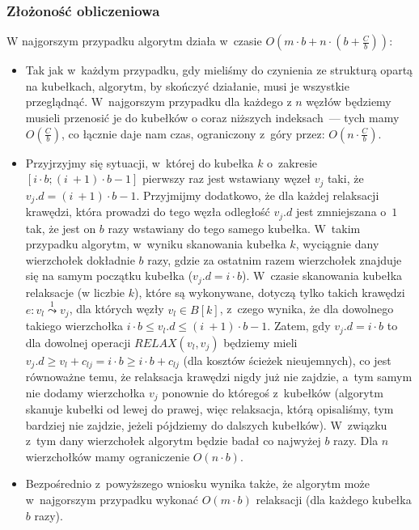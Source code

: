 \subsubsection{Złożoność obliczeniowa}

W najgorszym przypadku algorytm działa w~czasie $ O \left( m \cdot b + n \cdot \left( b + \frac{C}{b}\right) \right)$:

\begin{itemize}
\item Tak jak w~każdym przypadku, gdy mieliśmy do czynienia ze strukturą opartą na kubełkach, algorytm, by skończyć działanie, musi je wszystkie przeglądnąć. W~najgorszym przypadku dla każdego z $n$ węzłów będziemy musieli przenosić je do kubełków o coraz niższych indeksach~--- tych mamy $O \left( \frac{C}{b} \right)$, co łącznie daje nam czas, ograniczony z~góry przez: $O \left( n \cdot \frac{C}{b} \right)$.
\item Przyjrzyjmy się sytuacji, w~której do kubełka $k$ o~zakresie $\left[ i \cdot b ; \left( i~+ 1 \right) \cdot b - 1 \right]$ pierwszy raz jest wstawiany węzeł $v_{j}$ taki, że $v_{j}.d = \left( i~+ 1 \right) \cdot b - 1$. Przyjmijmy dodatkowo, że dla każdej relaksacji krawędzi, która prowadzi do tego węzła odległość $v_{j}.d$ jest zmniejszana o~$1$ tak, że jest on $b$ razy wstawiany do tego samego kubełka. W~takim przypadku algorytm, w~wyniku skanowania kubełka $k$, wyciągnie dany wierzchołek dokładnie $b$ razy, gdzie za ostatnim razem wierzchołek znajduje się na samym początku kubełka ($v_{j}.d = i \cdot b$). W~czasie skanowania kubełka relaksacje (w liczbie $k$), które są wykonywane, dotyczą tylko takich krawędzi $e : v_{l} \overset{1}\leadsto v_{j}$, dla których węzły $v_{l} \in B \left[ k \right]$, z~czego wynika, że dla dowolnego takiego wierzchołka $ i \cdot b \leqslant v_{l}.d \leqslant \left( i~+ 1 \right) \cdot b - 1$. Zatem, gdy $v_{j}.d = i \cdot b$ to dla dowolnej operacji $RELAX \left( v_{l}, v_{j} \right)$ będziemy mieli $ v_{j}.d \geqslant v_{l} + c_{lj} = i \cdot b \geqslant i \cdot b + c_{lj}$ (dla kosztów ścieżek nieujemnych), co jest równoważne temu, że relaksacja krawędzi nigdy już nie zajdzie, a~tym samym nie dodamy wierzchołka $v_{j}$ ponownie do któregoś z~kubełków (algorytm skanuje kubełki od lewej do prawej, więc relaksacja, którą opisaliśmy, tym bardziej nie zajdzie, jeżeli pójdziemy do dalszych kubełków). W~związku z~tym dany  wierzchołek algorytm będzie badał co najwyżej $b$ razy. Dla $n$ wierzchołków mamy ograniczenie $O \left( n \cdot b \right)$.
\item Bezpośrednio z~powyższego wniosku wynika także, że algorytm może w~najgorszym przypadku wykonać $O \left( m \cdot b \right)$ relaksacji (dla każdego kubełka $b$ razy).
\end{itemize}

